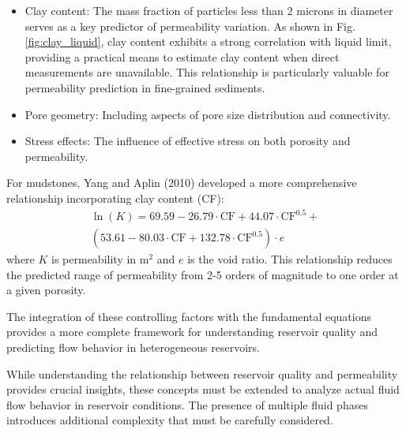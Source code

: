 \documentclass[journal]{IEEEtran}
\begin{document}
\begin{itemize}
    \item Clay content: The mass fraction of particles less than 2 microns in diameter serves as a key predictor of permeability variation. As shown in Fig. \ref{fig:clay_liquid}, clay content exhibits a strong correlation with liquid limit, providing a practical means to estimate clay content when direct measurements are unavailable. This relationship is particularly valuable for permeability prediction in fine-grained sediments.
    \item Pore geometry: Including aspects of pore size distribution and connectivity.
    \item Stress effects: The influence of effective stress on both porosity and permeability.
\end{itemize}

For mudstones, Yang and Aplin (2010)\cite{yang_permeabilityporosity_2010} developed a more comprehensive relationship incorporating clay content (CF):
\begin{align}
\ln(K) = 69.59 - 26.79\cdot\text{CF} + 44.07\cdot\text{CF}^{0.5} + \nonumber\\
(53.61 - 80.03\cdot\text{CF} + 132.78\cdot\text{CF}^{0.5})\cdot e
\end{align}
\noindent where $K$ is permeability in m$^2$ and $e$ is the void ratio. This relationship reduces the predicted range of permeability from 2-5 orders of magnitude to one order at a given porosity.

The integration of these controlling factors with the fundamental equations provides a more complete framework for understanding reservoir quality and predicting flow behavior in heterogeneous reservoirs.

While understanding the relationship between reservoir quality and permeability provides crucial insights, these concepts must be extended to analyze actual fluid flow behavior in reservoir conditions. The presence of multiple fluid phases introduces additional complexity that must be carefully considered.
\end{document}
